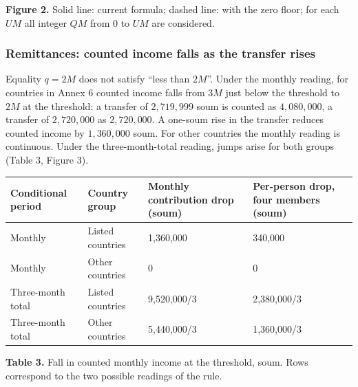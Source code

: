 \documentclass[14pt,a4paper]{extarticle}
\begin{document}
\begin{center}
\end{center}
\textbf{Figure 2.} Solid line: current formula; dashed line: with the zero floor; for each $UM$ all integer $QM$ from $0$ to $UM$ are considered.

\subsubsection{Remittances: counted income falls as the transfer rises}\label{res:rem}
Equality $q=2M$ does not satisfy “less than $2M$”. Under the monthly reading, for countries in Annex 6 counted income falls from $3M$ just below the threshold to $2M$ at the threshold: a transfer of $2{,}719{,}999$ soum is counted as $4{,}080{,}000$, a transfer of $2{,}720{,}000$ as $2{,}720{,}000$. A one-soum rise in the transfer reduces counted income by $1{,}360{,}000$ soum. For other countries the monthly reading is continuous. Under the three-month-total reading, jumps arise for both groups (Table 3, Figure 3).

\begingroup\fontsize{11bp}{13.2bp}\selectfont
\begin{longtable}{p{} p{} p{} p{}}
\toprule
Conditional period & Country group & Monthly contribution drop (soum) & Per-person drop, four members (soum) \\
\midrule
\endhead
Monthly & Listed countries & 1,360,000 & 340,000 \\
Monthly & Other countries & 0 & 0 \\
Three-month total & Listed countries & 9,520,000/3 & 2,380,000/3 \\
Three-month total & Other countries & 5,440,000/3 & 1,360,000/3 \\
\bottomrule
\end{longtable}
\endgroup
\textbf{Table 3.} Fall in counted monthly income at the threshold, soum. Rows correspond to the two possible readings of the rule.
\end{document}
